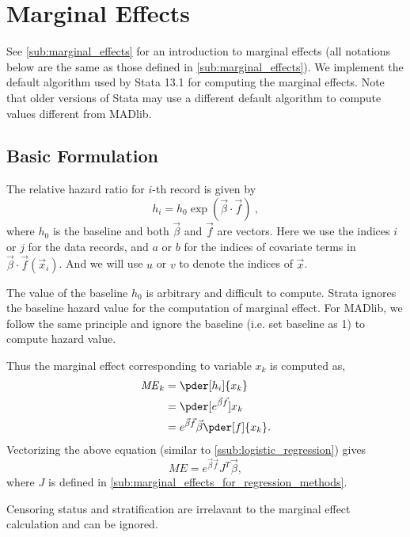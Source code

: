 \section{Marginal Effects}

See \ref{sub:marginal_effects} for an introduction to marginal effects
(all notations below are the same as those defined in \ref{sub:marginal_effects}).
We implement the default algorithm used by Stata 13.1 for computing the
marginal effects. Note that older versions of Stata may use a
different default algorithm to compute values different from MADlib.

\subsection{Basic Formulation}

The relative hazard ratio for $i$-th record is given by
\begin{equation}
    h_i = h_0 \exp \left( \vec{\beta}\cdot\vec{f} \right)\ ,
\end{equation}
where $h_0$ is the baseline and both $\vec{\beta}$ and
$\vec{f}$ are vectors.  Here we use the indices
$i$ or $j$ for the data records, and $a$ or $b$ for the indices of
covariate terms in $\vec{\beta}\cdot \vec{f}(\vec{x}_i)$. And we will use
$u$ or $v$ to denote the indices of $\vec{x}$.

The value of the baseline $h_0$ is arbitrary and difficult to compute. Strata
ignores the baseline hazard value for the computation of marginal effect. For
MADlib, we follow the same principle and ignore the baseline (i.e. set baseline
as 1) to compute hazard value.

Thus the marginal effect corresponding to variable $x_k$ is computed as,
\begin{align*} \label{eq:me1}
    \mathit{ME}_{k} & = \pder[h_i]{x_k} \\
           & =  \pder[e^{\vec{\beta} \vec{f}}]{x_k} \\
           & = e^{\vec{\beta} \vec{f}} \vec{\beta} \pder[f]{x_k}.
\end{align*}
Vectorizing the above equation (similar to \ref{ssub:logistic_regression}) gives
\begin{equation*}
  \mathit{ME} = e^{\vec{\beta} \vec{f}} J^T \vec{\beta},
 \end{equation*}
where $J$ is defined in \ref{sub:marginal_effects_for_regression_methods}.


Censoring status and stratification are irrelavant to the marginal effect
calculation and can be ignored.

